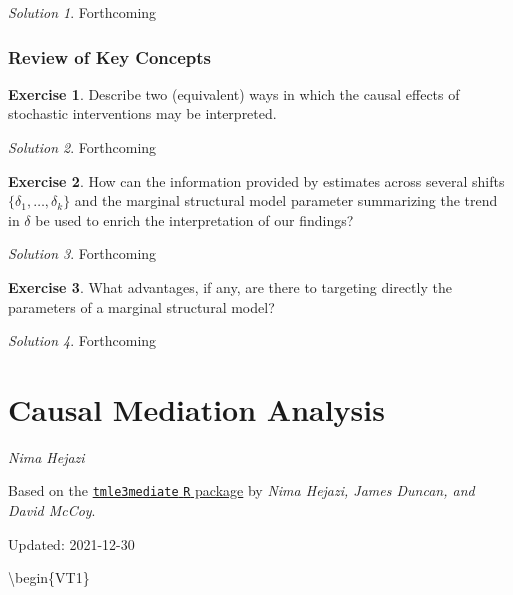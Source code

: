 \documentclass[
  12pt, krantz2,
]{krantz}
\newcommand{\passthrough}[1]{#1}
\newcommand{\1}{\mathbbm{1}}
\theoremstyle{definition}
\theoremstyle{definition}
\theoremstyle{definition}
\newtheorem{exercise}{Exercise}[chapter]
\theoremstyle{definition}
\theoremstyle{remark}
\newtheorem*{solution}{Solution}
\begin{document}
\begin{solution}
Forthcoming
\end{solution}

\hypertarget{review-of-key-concepts-2}{%
\subsection{Review of Key Concepts}\label{review-of-key-concepts-2}}

\begin{exercise}
Describe two (equivalent) ways in which the causal effects of stochastic
interventions may be interpreted.
\end{exercise}

\begin{solution}
Forthcoming
\end{solution}

\begin{exercise}
How can the information provided by estimates across several shifts \(\{ \delta_1, \ldots, \delta_k \}\) and the marginal structural model parameter
summarizing the trend in \(\delta\) be used to enrich the interpretation of our
findings?
\end{exercise}

\begin{solution}
Forthcoming
\end{solution}

\begin{exercise}
What advantages, if any, are there to targeting directly the parameters of a
marginal structural model?
\end{exercise}

\begin{solution}
Forthcoming
\end{solution}

\hypertarget{causal-mediation-analysis}{%
\chapter{Causal Mediation Analysis}\label{causal-mediation-analysis}}

\emph{Nima Hejazi}

Based on the \href{https://github.com/tlverse/tmle3mediate}{\passthrough{\lstinline!tmle3mediate!} \passthrough{\lstinline!R!}
package} by \emph{Nima Hejazi, James
Duncan, and David McCoy}.

Updated: 2021-12-30

\textbackslash begin\{VT1\}
\end{document}
